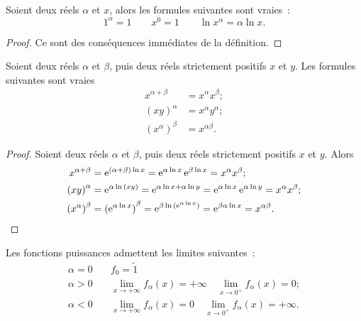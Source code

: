 \begin{prop}
  Soient deux réels \(\alpha\) et \(x\), alors les formules suivantes sont
  vraies~:
  \begin{equation}
    1^{\alpha} = 1 \qquad x^0 = 1 \qquad \ln x^{\alpha} = \alpha \ln x.
  \end{equation}
\end{prop}

\begin{proof}
  Ce sont des conséquences immédiates de la définition.
\end{proof}

\begin{prop}
  Soient deux réels \(\alpha\) et \(\beta\), puis deux réels strictement
  positifs \(x\) et \(y\). Les formules suivantes sont vraies
  \begin{align*}
    x^{\alpha+\beta} &= x^\alpha x^\beta;\\
    {(xy)}^\alpha &= x^\alpha y^\alpha;\\
    {(x^\alpha)}^\beta &= x^{\alpha\beta}.
  \end{align*}
\end{prop}

\begin{proof}
  Soient deux réels \(\alpha\) et \(\beta\), puis deux réels strictement
  positifs \(x\) et \(y\). Alors
  \begin{align*}
    x^{\alpha+\beta} & = \operatorname{e}^{(\alpha+\beta)\ln x} = \operatorname{e}^{\alpha \ln x} \operatorname{e}^{\beta
    \ln x} = x^\alpha x^\beta;\\
      {(xy)}^\alpha & = \operatorname{e}^{\alpha \ln{(xy)}} = \operatorname{e}^{\alpha \ln x +\alpha \ln y} =
      \operatorname{e}^{\alpha \ln x} \operatorname{e}^{\alpha \ln y} = x^\alpha x^\beta ;\\
      {(x^\alpha)}^\beta & = {(\operatorname{e}^{\alpha \ln x})}^\beta = \operatorname{e}^{\beta \ln{(\operatorname{e}^{\alpha
      \ln x})}} = \operatorname{e}^{\beta \alpha \ln x} = x^{\alpha \beta}.
        \end{align*}
\end{proof}

Les fonctions puissances admettent les limites suivantes~:
\begin{align*}
  \alpha = 0 &\quad f_0 = \tilde{1} \\
  \alpha>0 &\quad \lim\limits_{x \to +\infty} f_\alpha(x) = +\infty \quad
  \lim\limits_{x \to 0^{+}} f_\alpha(x) = 0;\\
  \alpha<0 &\quad \lim\limits_{x \to +\infty} f_\alpha(x) = 0 \quad
  \lim\limits_{x \to 0^{+}} f_\alpha(x) = +\infty.
\end{align*}

